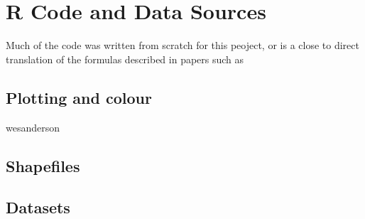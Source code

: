 \section{R Code and Data Sources}
\label{ch:codesource}

Much of the code was written from scratch for this peoject, or is a close to direct translation of the formulas described in papers such as %

\subsection{Plotting and colour}

wesanderson

\subsection{Shapefiles}

\subsection{Datasets}

